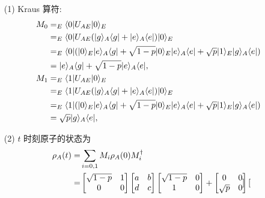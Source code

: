 \documentclass{assignment}
\begin{document}
\begin{sol}
    \begin{itemize}
        \item[(1)] Kraus 算符:
        \begin{align}
            M_0&=_E\langle 0\rvert U_{AE}\lvert 0\rangle_E\\
            \notag&=_E\langle 0\rvert U_{AE}(\lvert g\rangle_A\langle g\rvert+\lvert e\rangle_A\langle e\rvert)\lvert 0\rangle_E\\
            \notag&=_E\langle 0\rvert(\lvert 0\rangle_E\lvert e\rangle_A\langle g\rvert+\sqrt{1-p}\lvert 0\rangle_E\lvert e\rangle_A\langle e\rvert+\sqrt{p}\lvert 1\rangle_E\lvert g\rangle_A\langle e\rvert)\\
            &=\lvert e\rangle_A\langle g\rvert+\sqrt{1-p}\lvert e\rangle_A\langle e\rvert,\\
            \notag M_1&=_E\langle 1\rvert U_{AE}\lvert 0\rangle_E\\
            \notag&=_E\langle 1\rvert U_{AE}(\lvert g\rangle_A\langle g\rvert+\lvert e\rangle_A\langle e\rvert)\lvert 0\rangle_E\\
            \notag&=_E\langle 1\rvert(\lvert 0\rangle_E\lvert e\rangle_A\langle g\rvert+\sqrt{1-p}\lvert 0\rangle_E\lvert e\rangle_A\langle e\rvert+\sqrt{p}\lvert 1\rangle_E\lvert g\rangle_A\langle e\rvert)\\
            &=\sqrt{p}\lvert g\rangle_A\langle e\rvert,
        \end{align}
        \item[(2)] $t$ 时刻原子的状态为
        \begin{align}
            \notag\rho_A(t)=&\sum_{i=0,1}M_i\rho_A(0)M_i^{\dagger}\\
            \notag=&\begin{bmatrix}
                \sqrt{1-p}&1\\
                0&0
            \end{bmatrix}\begin{bmatrix}
                a&b\\
                d&c
            \end{bmatrix}\begin{bmatrix}
                \sqrt{1-p}&0\\
                1&0
            \end{bmatrix}+\begin{bmatrix}
                0&0\\
                \sqrt{p}&0
            \end{bmatrix}\begin{bmatrix}

\end{bmatrix}
\end{align}
\end{itemize}
\end{sol}
\end{document}
